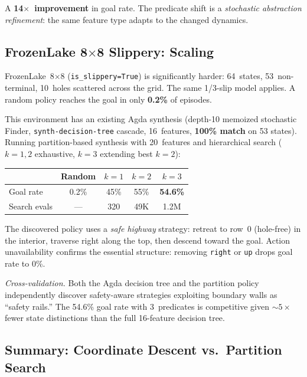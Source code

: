 \documentclass[9pt,a4paper]{article}
\theoremstyle{plain}
\theoremstyle{definition}
\theoremstyle{remark}
\begin{document}
A \textbf{14$\times$~improvement} in goal rate.  The predicate shift is a \emph{stochastic abstraction refinement}: the same feature type adapts to the changed dynamics.

\subsection{FrozenLake 8\texorpdfstring{$\times$}{x}8 Slippery: Scaling}

FrozenLake~8$\times$8 (\texttt{is\_slippery=True}) is significantly harder: 64~states, 53~non-terminal, 10~holes scattered across the grid.  The same 1/3-slip model applies.  A random policy reaches the goal in only \textbf{0.2\%} of episodes.

This environment has an existing Agda synthesis (depth-10 memoized stochastic Finder, \texttt{synth-decision-tree} cascade, 16~features, \textbf{100\% match} on 53 states).  Running partition-based synthesis with 20~features and hierarchical search ($k{=}1{,}2$ exhaustive, $k{=}3$ extending best $k{=}2$):

\begin{center}
\small
\begin{tabular}{@{}lcccc@{}}
  & \textbf{Random} & \textbf{$k{=}1$} & \textbf{$k{=}2$} & \textbf{$k{=}3$} \\
\hline
Goal rate & 0.2\% & 45\% & 55\% & \textbf{54.6\%} \\
Search evals & --- & 320 & 49K & 1.2M \\
\end{tabular}
\end{center}

The discovered policy uses a \emph{safe highway} strategy: retreat to row~0 (hole-free) in the interior, traverse right along the top, then descend toward the goal.  Action unavailability confirms the essential structure: removing \texttt{right} or \texttt{up} drops goal rate to 0\%.

\emph{Cross-validation.}  Both the Agda decision tree and the partition policy independently discover safety-aware strategies exploiting boundary walls as ``safety rails.''  The 54.6\% goal rate with 3~predicates is competitive given ${\sim}5\times$ fewer state distinctions than the full 16-feature decision tree.

\subsection{Summary: Coordinate Descent vs.\ Partition Search}
\end{document}
